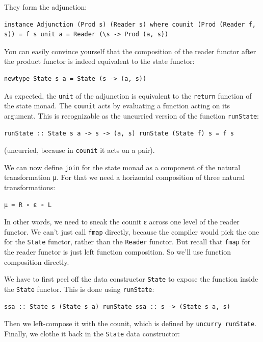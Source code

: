 They form the adjunction:

\begin{verbatim}
instance Adjunction (Prod s) (Reader s) where counit (Prod (Reader f, s)) = f s unit a = Reader (\s -> Prod (a, s))
\end{verbatim}

You can easily convince yourself that the composition of the reader
functor after the product functor is indeed equivalent to the state
functor:

\begin{verbatim}
newtype State s a = State (s -> (a, s))
\end{verbatim}

As expected, the \texttt{unit} of the adjunction is equivalent to the
\texttt{return} function of the state monad. The \texttt{counit} acts by
evaluating a function acting on its argument. This is recognizable as
the uncurried version of the function \texttt{runState}:

\begin{verbatim}
runState :: State s a -> s -> (a, s) runState (State f) s = f s
\end{verbatim}

(uncurried, because in \texttt{counit} it acts on a pair).

We can now define \texttt{join} for the state monad as a component of
the natural transformation μ. For that we need a horizontal composition
of three natural transformations:

\begin{verbatim}
μ = R ∘ ε ∘ L
\end{verbatim}

In other words, we need to sneak the counit ε across one level of the
reader functor. We can't just call \texttt{fmap} directly, because the
compiler would pick the one for the \texttt{State} functor, rather than
the \texttt{Reader} functor. But recall that \texttt{fmap} for the
reader functor is just left function composition. So we'll use function
composition directly.

We have to first peel off the data constructor \texttt{State} to expose
the function inside the \texttt{State} functor. This is done using
\texttt{runState}:

\begin{verbatim}
ssa :: State s (State s a) runState ssa :: s -> (State s a, s)
\end{verbatim}

Then we left-compose it with the counit, which is defined by
\texttt{uncurry\ runState}. Finally, we clothe it back in the
\texttt{State} data constructor:

